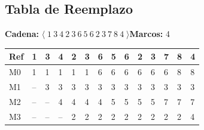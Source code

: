 \documentclass[12pt,a4paper]{article}
\begin{document}
\subsection{Tabla de Reemplazo}
\textbf{Cadena:} $\langle\;1\ 3\ 4\ 2\ 3\ 6\ 5\ 6\ 2\ 3\ 7\ 8\ 4\;\rangle$\quad\textbf{Marcos:} 4
\medskip
\begin{center}
\scriptsize\setlength{\tabcolsep}{2pt}
\begin{tabular}{|l|>{\centering\arraybackslash}p{0.4cm}|>{\centering\arraybackslash}p{0.4cm}|>{\centering\arraybackslash}p{0.4cm}|>{\centering\arraybackslash}p{0.4cm}|>{\centering\arraybackslash}p{0.4cm}|>{\centering\arraybackslash}p{0.4cm}|>{\centering\arraybackslash}p{0.4cm}|>{\centering\arraybackslash}p{0.4cm}|>{\centering\arraybackslash}p{0.4cm}|>{\centering\arraybackslash}p{0.4cm}|>{\centering\arraybackslash}p{0.4cm}|>{\centering\arraybackslash}p{0.4cm}|>{\centering\arraybackslash}p{0.4cm}|}
\hline
\textbf{Ref} & \cellcolor{faultcol!50}\textbf{1} & \cellcolor{faultcol!50}\textbf{3} & \cellcolor{faultcol!50}\textbf{4} & \cellcolor{faultcol!50}\textbf{2} & \cellcolor{hitcol!40}\textbf{3} & \cellcolor{faultcol!50}\textbf{6} & \cellcolor{faultcol!50}\textbf{5} & \cellcolor{hitcol!40}\textbf{6} & \cellcolor{hitcol!40}\textbf{2} & \cellcolor{hitcol!40}\textbf{3} & \cellcolor{faultcol!50}\textbf{7} & \cellcolor{faultcol!50}\textbf{8} & \cellcolor{faultcol!50}\textbf{4} \\
\hline
M0 & \cellcolor{pB!40}1 & \cellcolor{pB!40}1 & \cellcolor{pB!40}1 & \cellcolor{pB!40}1 & \cellcolor{pB!40}1 & \cellcolor{pG!40}6 & \cellcolor{pG!40}6 & \cellcolor{pG!40}6 & \cellcolor{pG!40}6 & \cellcolor{pG!40}6 & \cellcolor{pG!40}6 & \cellcolor{pI!40}8 & \cellcolor{pI!40}8 \\
M1 & {\color{gray!60}--} & \cellcolor{pD!40}3 & \cellcolor{pD!40}3 & \cellcolor{pD!40}3 & \cellcolor{pD!40}3 & \cellcolor{pD!40}3 & \cellcolor{pD!40}3 & \cellcolor{pD!40}3 & \cellcolor{pD!40}3 & \cellcolor{pD!40}3 & \cellcolor{pD!40}3 & \cellcolor{pD!40}3 & \cellcolor{pD!40}3 \\
M2 & {\color{gray!60}--} & {\color{gray!60}--} & \cellcolor{pE!40}4 & \cellcolor{pE!40}4 & \cellcolor{pE!40}4 & \cellcolor{pE!40}4 & \cellcolor{pF!40}5 & \cellcolor{pF!40}5 & \cellcolor{pF!40}5 & \cellcolor{pF!40}5 & \cellcolor{pH!40}7 & \cellcolor{pH!40}7 & \cellcolor{pH!40}7 \\
M3 & {\color{gray!60}--} & {\color{gray!60}--} & {\color{gray!60}--} & \cellcolor{pC!40}2 & \cellcolor{pC!40}2 & \cellcolor{pC!40}2 & \cellcolor{pC!40}2 & \cellcolor{pC!40}2 & \cellcolor{pC!40}2 & \cellcolor{pC!40}2 & \cellcolor{pC!40}2 & \cellcolor{pC!40}2 & \cellcolor{pE!40}4 \\

\end{tabular}
\end{center}
\end{document}
